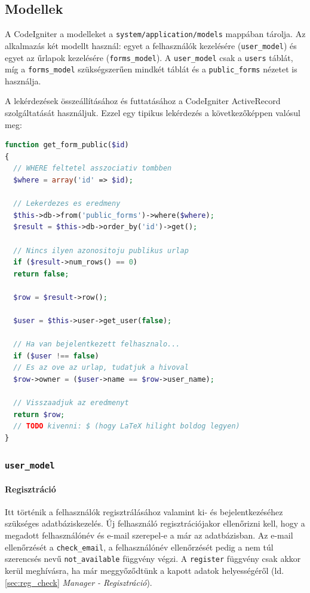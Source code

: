 \documentclass[12pt,a4paper,twoside]{article}
\begin{document}
\subsection{Modellek}
\label{sec:modellek}

A CodeIgniter a modelleket a \texttt{system/application/models} mappában
tárolja. Az alkalmazás két modellt használ: egyet a felhasználók kezelésére
(\texttt{user\_model}) és egyet az űrlapok kezelésére (\texttt{forms\_model}). A
\texttt{user\_model} csak a \texttt{users} táblát, míg a
\texttt{forms\_model} szükségszerűen mindkét táblát és a \texttt{public\_forms}
nézetet is használja.

A lekérdezések összeállításához és futtatásához a CodeIgniter ActiveRecord
szolgáltatását használjuk. Ezzel egy tipikus lekérdezés a következőképpen
valósul meg:

\begin{lstlisting}[language=PHP]
function get_form_public($id)
{
  // WHERE feltetel asszociativ tombben
  $where = array('id' => $id);

  // Lekerdezes es eredmeny
  $this->db->from('public_forms')->where($where);
  $result = $this->db->order_by('id')->get();

  // Nincs ilyen azonositoju publikus urlap
  if ($result->num_rows() == 0)
  return false;

  $row = $result->row();

  $user = $this->user->get_user(false);

  // Ha van bejelentkezett felhasznalo...
  if ($user !== false)
  // Es az ove az urlap, tudatjuk a hivoval
  $row->owner = ($user->name == $row->user_name);

  // Visszaadjuk az eredmenyt
  return $row;
  // TODO kivenni: $ (hogy LaTeX hilight boldog legyen)
}
\end{lstlisting}

\subsubsection{\texttt{user\_model}}

\paragraph{Regisztráció}
Itt történik a felhasználók regisztrálásához valamint ki- és bejelentkezéséhez
szükséges adatbáziskezelés. Új felhasználó regisztrációjakor ellenőrizni
kell, hogy a megadott felhasználónév és e-mail szerepel-e a már az
adatbázisban. Az e-mail ellenőrzését a \texttt{check\_email}, a felhasználónév
ellenőrzését pedig a nem túl szerencsés nevű \texttt{not\_available} függvény
végzi. A \texttt{register} függvény csak akkor kerül meghívásra, ha már
meggyőződtünk a kapott adatok helyességéről (ld. \ref{sec:reg_check} \textit{Manager -
Regisztráció}).
\end{document}
